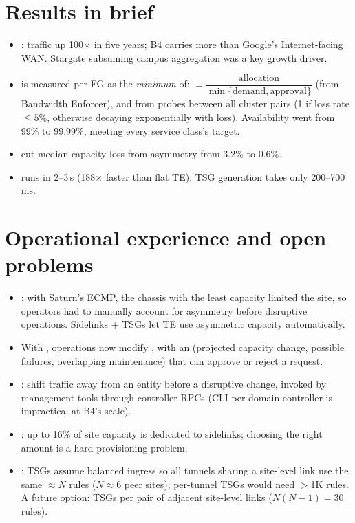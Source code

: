 \section{Results in brief}
\begin{itemize}
\item {}: traffic up 100$\times$ in five years; B4 carries more than Google's Internet-facing WAN. Stargate subsuming campus aggregation was a key growth driver.
\item {} is measured per FG as the \emph{minimum} of:  $=\dfrac{\text{allocation}}{\min\{\text{demand},\text{approval}\}}$ (from Bandwidth Enforcer), and  from probes between all cluster pairs (1 if loss rate $\le 5\%$, otherwise decaying exponentially with loss). Availability went from 99\% to 99.99\%, meeting every service class's target.
\item {} cut median capacity loss from asymmetry from 3.2\% to 0.6\%.
\item {} runs in 2--3\,s (188$\times$ faster than flat TE); TSG generation takes only 200--700\,ms.
\end{itemize}

\section{Operational experience and open problems}
\begin{itemize}
\item {}: with Saturn's ECMP, the chassis with the least capacity limited the site, so operators had to manually account for asymmetry before disruptive operations. Sidelinks + TSGs let TE use asymmetric capacity automatically.
\item With , operations now modify , with an  (projected capacity change, possible failures, overlapping maintenance) that can approve or reject a request.
\item {}: shift traffic away from an entity before a disruptive change, invoked by management tools through controller RPCs (CLI per domain controller is impractical at B4's scale).
\item {}: up to 16\% of site capacity is dedicated to sidelinks; choosing the right amount is a hard provisioning problem.
\item {}: TSGs assume balanced ingress so all tunnels sharing a site-level link use the same $\approx N$ rules ($N\approx 6$ peer sites); per-tunnel TSGs would need $>$1K rules. A future option: TSGs per pair of adjacent site-level links ($N(N-1)=30$ rules).
\end{itemize}

